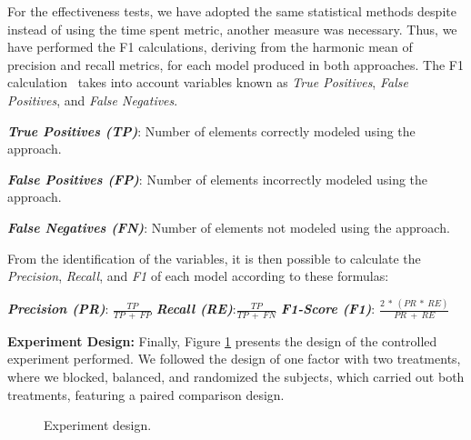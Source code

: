 For the effectiveness tests, we have adopted the same statistical methods despite instead of using the time spent metric, another measure was necessary.
Thus, we have performed the F1 calculations, deriving from the harmonic mean of precision and recall metrics, for each model produced in both approaches.
The F1 calculation~\cite{Derczynski:2016} takes into account variables known as \textit{True Positives}, \textit{False Positives}, and \textit{False Negatives}.
\begin{description}
    \item \textbf{\textit{True Positives (TP)}}: Number of elements correctly modeled using the approach.
    \item \textbf{\textit{False Positives (FP)}}: Number of elements incorrectly modeled using the approach. 
    \item \textbf{\textit{False Negatives (FN)}}: Number of elements not modeled using the approach.
\end{description}
From the identification of the variables, it is then possible to calculate the \textit{Precision}, \textit{Recall}, and \textit{F1} of each model according to these formulas:
\begin{description}
    \item \textbf{\textit{Precision (PR)}}: $\frac{TP}{TP~+~FP}$ 
    \hfill 
    \textbf{\textit{Recall (RE)}}:$\frac{TP}{TP~+~FN}$
    \hfill
    \textbf{\textit{F1-Score (F1)}}: $\frac{2~*~(PR~*~ RE)}{PR~+~RE}$
\end{description}

\textbf{Experiment Design:} Finally, Figure \ref{fig:designExp} presents the design of the controlled experiment performed. 
We followed the design of one factor with two treatments, where we blocked, balanced, and randomized the subjects, which carried out both treatments, featuring a paired comparison design.

\begin{figure}[!htb]
    \centering
    \caption{Experiment design.}
    \label{fig:designExp}
    
\end{figure}


